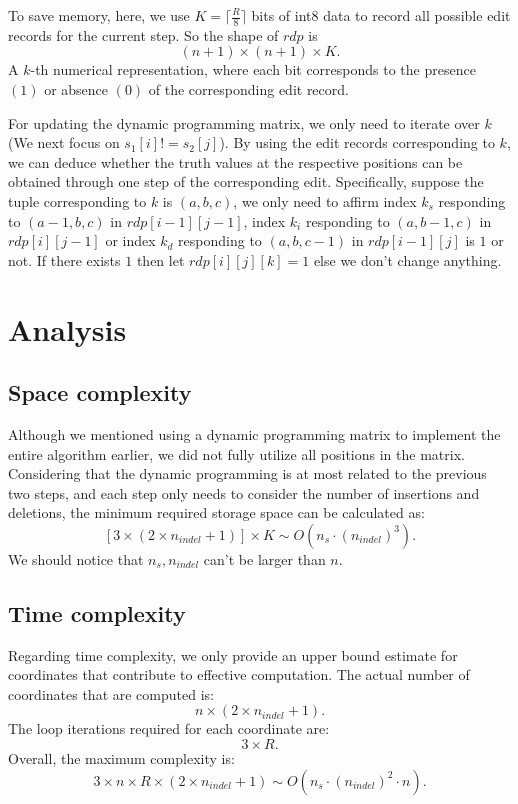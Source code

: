\documentclass{article}
\begin{document}
To save memory, here, we use $K = \lceil \frac{R}{8}\rceil$ bits of int8 data to record all possible edit records for the current step. So the shape of $rdp$ is 
\[(n+1)\times (n+1)\times K.\]
A $k$-th numerical representation, where each bit corresponds to the presence $(1)$ or absence $(0)$ of the corresponding edit record.

For updating the dynamic programming matrix, we only need to iterate over $k$ (We next focus on $s_1[i]!=s_2[j]$). By using the edit records corresponding to $k$, we can deduce whether the truth values at the respective positions can be obtained through one step of the corresponding edit. Specifically, suppose the tuple corresponding to $k$ is $(a,b,c)$, we only need to affirm index $k_s$ responding to $(a-1,b,c)$ in $rdp[i-1][j-1]$, index $k_i$ responding to $(a, b-1, c)$ in $rdp[i][j - 1]$ or index $k_d$ responding to $(a,b,c-1)$ in $rdp[i-1][j]$ is $1$ or not. If there exists $1$ then let $rdp[i][j][k]=1$ else we don't change anything.


\section{Analysis}
\subsection{Space complexity}
Although we mentioned using a dynamic programming matrix to implement the entire algorithm earlier, we did not fully utilize all positions in the matrix. Considering that the dynamic programming is at most related to the previous two steps, and each step only needs to consider the number of insertions and deletions, the minimum required storage space can be calculated as:
\[[3\times (2\times n_{indel} + 1) ]\times K\sim O(n_s\cdot (n_{indel})^3).\]
We should notice that $n_s,n_{indel}$ can't be larger than $n$.

\subsection{Time complexity}
Regarding time complexity, we only provide an upper bound estimate for coordinates that contribute to effective computation. The actual number of coordinates that are computed is:
\[n\times (2\times n_{indel} + 1).\]
The loop iterations required for each coordinate are:
\[3\times R.\]
Overall, the maximum complexity is:
\[3\times n\times R\times (2\times n_{indel}+1)\sim O(n_s\cdot (n_{indel})^2 \cdot n).\]
\end{document}
